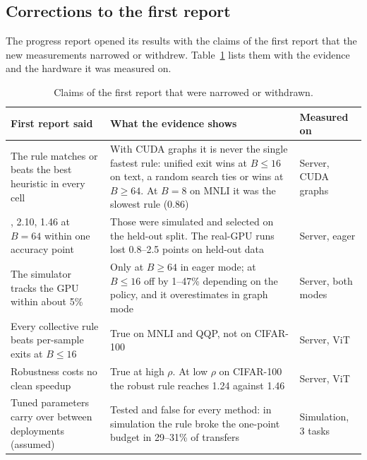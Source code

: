 \subsection{Corrections to the first report}
The progress report opened its results with the claims of the first report that the new measurements
narrowed or withdrew. Table~\ref{tab:corrections} lists them with the evidence and the hardware it was measured on.
\begin{table}[H]
  \centering\small
  \begin{tabularx}{\textwidth}{@{}>{\raggedright\arraybackslash}p{4.2cm}X>{\raggedright\arraybackslash}p{2.3cm}@{}}
    \toprule
    First report said & What the evidence shows & Measured on \\
    \midrule
    The rule matches or beats the best heuristic in every cell & With CUDA graphs it is never the single fastest
      rule: unified exit wins at $B\le16$ on text, a random search ties or wins at $B\ge64$. At $B=8$ on MNLI it was
      the slowest rule (0.86\x) & Server, CUDA graphs \\
    1.41\x, 2.10\x, 1.46\x{} at $B=64$ within one accuracy point & Those were simulated and selected on the held-out
      split. The real-GPU runs lost 0.8--2.5 points on held-out data & Server, eager \\
    The simulator tracks the GPU within about 5\% & Only at $B\ge64$ in eager mode; at $B\le16$ off by 1--47\%
      depending on the policy\footnotemark, and it overestimates in graph mode & Server, both modes \\
    Every collective rule beats per-sample exits at $B\le16$ & True on MNLI and QQP, not on CIFAR-100 & Server, ViT \\
    Robustness costs no clean speedup & True at high $\rho$. At low $\rho$ on CIFAR-100 the robust rule reaches
      1.24\x{} against 1.46\x\footnotemark & Server, ViT \\
    Tuned parameters carry over between deployments (assumed) & Tested and false for every method: in simulation the
      rule broke the one-point budget in 29--31\% of transfers & Simulation, 3 tasks \\
    \bottomrule
  \end{tabularx}
  \caption{Claims of the first report that were narrowed or withdrawn.}
  \label{tab:corrections}
\end{table}
\addtocounter{footnote}{-1}%
%
%

